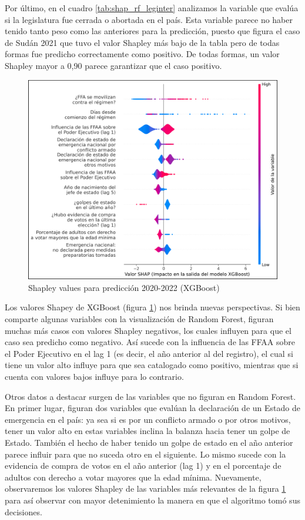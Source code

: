 \documentclass{article}
\begin{document}
Por último, en el cuadro \ref{tab:shap_rf_leginter} analizamos la variable que evalúa si la legislatura 
fue cerrada o abortada en el país. Esta variable parece no haber tenido tanto peso como las anteriores 
para la predicción, puesto que figura el caso de Sudán 2021 que tuvo el valor Shapley más bajo de la 
tabla pero de todas formas fue predicho correctamente como positivo. De todas formas, un valor Shapley
mayor a 0,90 parece garantizar que el caso positivo.

\begin{figure}[H]
  \centering
  \includegraphics[width=1\textwidth]{10_shapley_values_xgb.png}
  \caption{Shapley values para predicción 2020-2022 (XGBoost)\label{fig:shapley_xgb}}
\end{figure}

Los valores Shapey de XGBoost (figura \ref{fig:shapley_xgb}) nos brinda nuevas perspectivas. 
Si bien comparte algunas variables con la visualización de Random Forest, figuran muchas más
casos con valores Shapley negativos, los cuales influyen para que el caso sea predicho como negativo. 
Así sucede con la influencia de las FFAA sobre el Poder Ejecutivo en el lag 1 (es decir, el año 
anterior al del registro),  el cual si tiene un valor alto influye para que sea catalogado como 
positivo, mientras que si cuenta con valores bajos influye para lo contrario.

Otros datos a destacar surgen de las variables que no figuran en Random Forest. En primer lugar,
figuran dos variables que evalúan la declaración de un Estado de emergencia en el país: ya sea si es 
por un conflicto armado o por otros motivos, tener un valor alto en estas variables inclina la balanza 
hacia tener un golpe de Estado. También el hecho de haber tenido un golpe de estado en el año anterior 
parece influir para que no suceda otro en el siguiente. Lo mismo sucede con la evidencia de compra de 
votos en el año anterior (lag 1) y en el porcentaje de adultos con derecho a votar mayores que la edad 
mínima. Nuevamente, observaremos los valores Shapley de las variables más relevantes de la figura
\ref{fig:shapley_xgb} para así observar con mayor detenimiento la manera en que el algoritmo tomó
sus decisiones.
\end{document}
